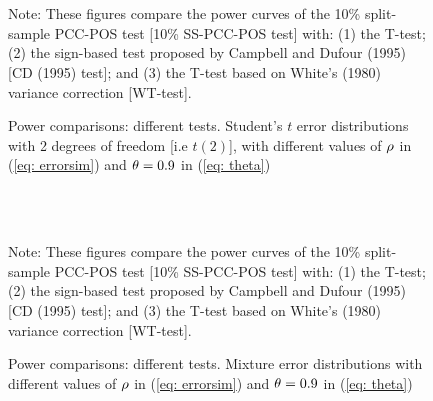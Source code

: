 \documentclass[harvard,11pt]{article}
\begin{document}
\begin{figure}[tbph]
\caption{Power comparisons: different tests. Student's $t$ error distributions with 2 degrees of freedom [i.e $t(2)$], with
different values of $\protect\rho $ in (\protect\ref{eq: errorsim}) and $\protect%
\theta =0.9$ in (\protect\ref{eq: theta})}
\begin{center}
 \\[0pt]
\\[0pt]
\end{center}
\doublespacing
Note: These figures compare the power curves of the 10\% split-sample PCC-POS test
[10\% SS-PCC-POS test] with: (1) the T-test; (2) the sign-based test
proposed by Campbell and Dufour (1995) [CD (1995) test]; and (3) the T-test based
on White's (1980) variance correction [WT-test]. 
\label{fig: Sim39}
\end{figure}



\begin{figure}[tbph]
\caption{Power comparisons: different tests. Mixture error distributions with
different values of $\protect\rho $ in (\protect\ref{eq: errorsim}) and $\protect%
\theta =0.9$ in (\protect\ref{eq: theta})}
\begin{center}
 \\[0pt]
\\[0pt]
\end{center}
\doublespacing
Note: These figures compare the power curves of the 10\% split-sample PCC-POS test
[10\% SS-PCC-POS test] with: (1) the T-test; (2) the sign-based test
proposed by Campbell and Dufour (1995) [CD (1995) test]; and (3) the T-test based
on White's (1980) variance correction [WT-test].
\label{fig: Sim410}
\end{figure}
\end{document}
